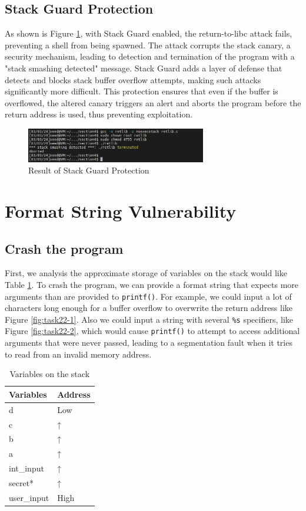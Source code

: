 \documentclass[a4paper,11pt]{article}
\begin{document}
\subsection{Stack Guard Protection}
As shown is Figure \ref{fig:task21}, with Stack Guard enabled, the return-to-libc attack fails, preventing a shell from being spawned. The attack corrupts the stack canary, a security mechanism, leading to detection and termination of the program with a "stack smashing detected" message. Stack Guard adds a layer of defense that detects and blocks stack buffer overflow attempts, making such attacks significantly more difficult. This protection ensures that even if the buffer is overflowed, the altered canary triggers an alert and aborts the program before the return address is used, thus preventing exploitation.
\begin{figure}[h]
    \centering
       \includegraphics[width=0.7\textwidth]{figures/task21/task21.png}
    \caption{Result of Stack Guard Protection}\label{fig:task21}
\end{figure}

\section{Format String Vulnerability}
\subsection{Crash the program}
First, we analysis the approximate storage of variables on the stack would like Table \ref{tab:task22}. To crash the program, we can provide a format string that expects more arguments than are provided to \verb|printf()|. For example, we could input a lot of characters long enough for a buffer overflow to overwrite the return address like Figure \ref{fig:task22-1}. Also we could input a string with several \verb|%s| specifiers, like Figure \ref{fig:task22-2}, which would cause \verb|printf()| to attempt to access additional arguments that were never passed, leading to a segmentation fault when it tries to read from an invalid memory address.

\begin{table}[h]\centering\caption{Variables on the stack}\label{tab:task22}
\begin{tabular}{ll}
Variables   & Address \\
\hline
d           & Low     \\
c           &   ↑       \\
b           &   ↑     \\
a           &   ↑      \\
int\_input  &   ↑      \\
secret*     &   ↑      \\
user\_input & High   
\end{tabular}
\end{table}
\end{document}
